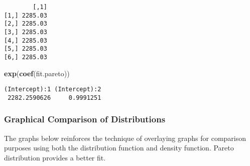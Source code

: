 \documentclass[]{book}
\newenvironment{Shaded}{\begin{snugshade}}{\end{snugshade}}
\newcommand{\KeywordTok}[1]{\textcolor[rgb]{0.13,0.29,0.53}{\textbf{#1}}}
\newcommand{\NormalTok}[1]{#1}
\theoremstyle{definition}
\theoremstyle{definition}
\theoremstyle{definition}
\theoremstyle{remark}
\begin{document}
\begin{verbatim}
        [,1]
[1,] 2285.03
[2,] 2285.03
[3,] 2285.03
[4,] 2285.03
[5,] 2285.03
[6,] 2285.03
\end{verbatim}

\begin{Shaded}
\begin{Highlighting}[]
\KeywordTok{exp}\NormalTok{(}\KeywordTok{coef}\NormalTok{(fit.pareto))}
\end{Highlighting}
\end{Shaded}

\begin{verbatim}
(Intercept):1 (Intercept):2 
 2282.2590626     0.9991251 
\end{verbatim}

\subsubsection{Graphical Comparison of
Distributions}\label{graphical-comparison-of-distributions}

The graphs below reinforces the technique of overlaying graphs for
comparison purposes using both the distribution function and density
function. Pareto distribution provides a better fit.
\end{document}
